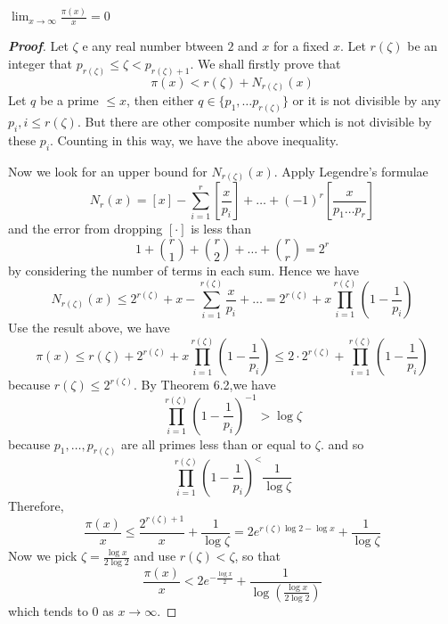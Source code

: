 \begin{theorem} $\lim_{x \to \infty} \frac{\pi(x)}{x}=0$
\end{theorem}
\begin{proof}[\bf Proof] Let $\zeta$ e any real number btween $2$ and $x$ for a fixed $x$. Let $r(\zeta)$ be an integer that $p_{r(\zeta)} \le \zeta <p_{r(\zeta)+1}$. We shall firstly prove that
$$\pi(x) < r(\zeta)+N_{r(\zeta)}(x)$$
Let $q$ be a prime $\le x$, then either $q \in \{p_1,\ldots p_{r(\zeta)}\}$ or it is not divisible
by any $p_i,i \le r(\zeta)$. But there are other composite number which is not divisible by these
$p_i$. Counting in this way, we have the above inequality.

Now we look for an upper bound for $N_{r(\zeta)}(x)$. Apply Legendre's formulae
$$N_r(x)=[x]-\sum_{i=1}^r\left[\frac{x}{p_i}\right]+\ldots +(-1)^r\left[\frac{x}{p_1\ldots p_r}\right]$$
and the error from dropping $[\cdot]$ is less than
$$1+\binom{r}{1}+\binom{r}{2}+\ldots +\binom{r}{r}=2^r$$ by considering the number of terms in each sum.
Hence we have
$$N_{r(\zeta)}(x) \le 2^{r(\zeta)}+x-\sum_{i=1}^{r(\zeta)}\frac{x}{p_i}+\ldots
=2^{r(\zeta)}+x \prod_{i=1}^{r(\zeta)} \left(1-\frac{1}{p_i}\right)$$
Use the result above, we have
$$\pi(x) \le r(\zeta)+2^{r(\zeta)}+x\prod_{i=1}^{r(\zeta)} \left(1-\frac{1}{p_i}\right)
\le 2\cdot 2^{r(\zeta)} + \prod_{i=1}^{r(\zeta)} \left(1-\frac{1}{p_i}\right)$$
because $r(\zeta) \le 2^{r(\zeta)}$. By Theorem 6.2,we have
$$\prod_{i=1}^{r(\zeta)} \left(1-\frac{1}{p_i}\right)^{-1} > \log{\zeta}$$
because $p_1,\ldots,p_{r(\zeta)}$ are all primes less than or equal to $\zeta$.
and so
$$\prod_{i=1}^{r(\zeta)} \left(1-\frac{1}{p_i}\right)^< \frac{1}{\log{\zeta}}$$
Therefore,
$$\frac{\pi(x)}{x} \le \frac{2^{r(\zeta)+1}}{x}+\frac{1}{\log{\zeta}}
=2e^{r(\zeta)\log{2}-\log{x}}+\frac{1}{\log{\zeta}}$$
Now we pick $\zeta=\frac{\log{x}}{2\log{2}}$ and use $r(\zeta) < \zeta$, so that
$$\frac{\pi(x)}{x} < 2e^{-\frac{\log{x}}{2}}+\frac{1}{\log{(\frac{\log{x}}{2\log{2}})}}$$
which tends to $0$ as $x \to \infty$.
\end{proof}




